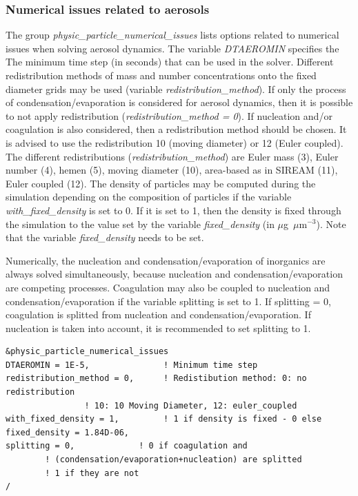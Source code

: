 \documentclass[a4paper,11pt]{article}
\begin{document}
\subsubsection{Numerical issues related to aerosols}

The group {\textit{physic\_particle\_numerical\_issues}} lists options related to numerical issues when solving aerosol dynamics. 
The variable {\textit{DTAEROMIN}} specifies the The minimum time step (in seconds) that can be used in the solver. 
Different redistribution methods of mass and number concentrations onto the fixed diameter grids may be used (variable {\textit{redistribution\_method}}). If only the process of condensation/evaporation is considered for aerosol dynamics, then it is possible to not apply redistribution ({\textit{redistribution\_method = 0}}). If nucleation and/or coagulation is also considered, then a redistribution method should be chosen. It is advised to use the redistribution 10 (moving diameter) or 12 (Euler coupled). The different redistributions ({\textit{redistribution\_method}}) are Euler mass (3), Euler number (4), hemen (5), moving diameter (10), area-based as in SIREAM (11), Euler coupled (12).
The density of particles may be computed during the simulation depending on the composition of particles if the variable {\textit{with\_fixed\_density}} is set to 0. If it is set to 1, then the density is fixed through the simulation to the value set by the variable {\textit{fixed\_density}} (in $\mu$g~$\mu$m$^{-3}$). Note that the variable {\textit{fixed\_density}} needs to be set.

Numerically, the nucleation and condensation/evaporation of inorganics are always solved simultaneously, because nucleation and condensation/evaporation are competing processes. Coagulation may also be coupled to nucleation and condensation/evaporation if the variable splitting is set to 1. If splitting = 0, coagulation is splitted from nucleation and condensation/evaporation. If nucleation is taken into account, it is recommended to set splitting to 1.

\begin{verbatim}
&physic_particle_numerical_issues
DTAEROMIN = 1E-5,              	! Minimum time step
redistribution_method = 0,   	! Redistibution method: 0: no redistribution
				! 10: 10 Moving Diameter, 12: euler_coupled
with_fixed_density = 1,       	! 1 if density is fixed - 0 else
fixed_density = 1.84D-06,        
splitting = 0,             ! 0 if coagulation and 
		! (condensation/evaporation+nucleation) are splitted 
		! 1 if they are not
/
\end{verbatim}
\end{document}

